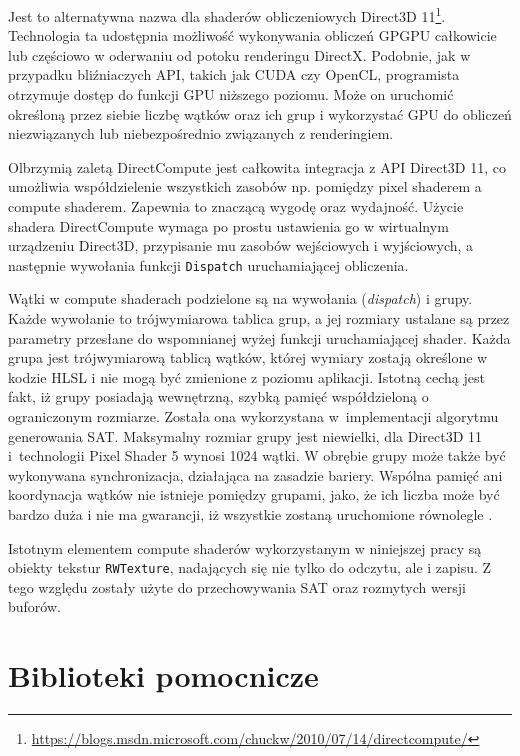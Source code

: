 	
	Jest to alternatywna nazwa dla shaderów obliczeniowych Direct3D 11\footnote{\url{https://blogs.msdn.microsoft.com/chuckw/2010/07/14/directcompute/}}. Technologia ta udostępnia możliwość wykonywania obliczeń GPGPU całkowicie lub częściowo w oderwaniu od potoku renderingu DirectX. Podobnie, jak w przypadku bliźniaczych API, takich jak CUDA czy OpenCL, programista otrzymuje dostęp do funkcji GPU niższego poziomu. Może on uruchomić określoną przez siebie liczbę wątków oraz ich grup i wykorzystać GPU do obliczeń niezwiązanych lub niebezpośrednio związanych z renderingiem.
	
	Olbrzymią zaletą DirectCompute jest całkowita integracja z API Direct3D 11, co umożliwia współdzielenie wszystkich zasobów np. pomiędzy pixel shaderem a compute shaderem. Zapewnia to znaczącą wygodę oraz wydajność. Użycie shadera DirectCompute wymaga po prostu ustawienia go w wirtualnym urządzeniu Direct3D, przypisanie mu zasobów wejściowych i wyjściowych, a następnie wywołania funkcji \texttt{Dispatch} uruchamiającej obliczenia.
	
	Wątki w compute shaderach podzielone są na wywołania (\textit{dispatch}) i grupy. Każde wywołanie to trójwymiarowa tablica grup, a jej rozmiary ustalane są przez parametry przesłane do wspomnianej wyżej funkcji uruchamiającej shader. Każda grupa jest trójwymiarową tablicą wątków, której wymiary zostają określone w kodzie HLSL i nie mogą być zmienione z poziomu aplikacji. Istotną cechą jest fakt, iż grupy posiadają wewnętrzną, szybką pamięć współdzieloną o ograniczonym rozmiarze. Została ona wykorzystana w~implementacji algorytmu generowania SAT. Maksymalny rozmiar grupy jest niewielki, dla Direct3D 11 i~technologii Pixel Shader 5 wynosi 1024 wątki. W obrębie grupy może także być wykonywana synchronizacja, działająca na zasadzie bariery. Wspólna pamięć ani koordynacja wątków nie istnieje pomiędzy grupami, jako, że ich liczba może być bardzo duża i nie ma gwarancji, iż wszystkie zostaną uruchomione równolegle \cite{directcompute}.
	
	Istotnym elementem compute shaderów wykorzystanym w niniejszej pracy są obiekty tekstur \texttt{RWTexture}, nadających się nie tylko do odczytu, ale i zapisu. Z tego względu zostały użyte do przechowywania SAT oraz rozmytych wersji buforów.
	
	\section{Biblioteki pomocnicze}
	\label{t:technologie:helpers}
	

